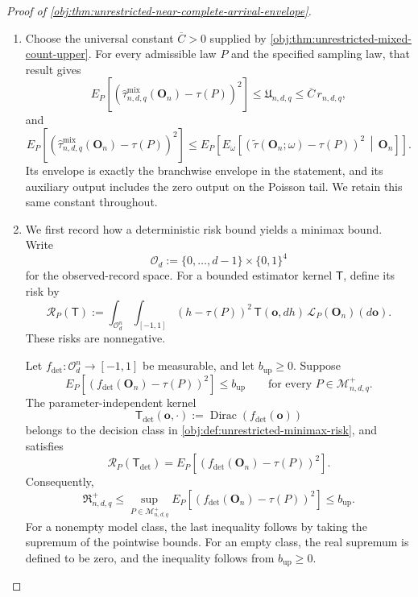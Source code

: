 \begin{proof}[Proof of \cref{obj:thm:unrestricted-near-complete-arrival-envelope}]
\begin{enumerate}
\item Choose the universal constant \(\overline C>0\) supplied by
\cref{obj:thm:unrestricted-mixed-count-upper}. For every admissible law \(P\) and the specified sampling law, that result gives
\[
E_P\!\left[
\left(\widehat\tau^{\mathrm{mix}}_{n,d,q}(\mathbf O_n)-\tau(P)\right)^2
\right]
\le \mathfrak U_{n,d,q}
\le \overline C\,r_{n,d,q},
\]
and
\[
E_P\!\left[
\left(\widehat\tau^{\mathrm{mix}}_{n,d,q}(\mathbf O_n)-\tau(P)\right)^2
\right]
\le
E_P\!\left[
E_\omega\!\left[
\left(\widetilde\tau(\mathbf O_n;\omega)-\tau(P)\right)^2
\,\middle|\,\mathbf O_n
\right]\right].
\]
Its envelope is exactly the branchwise envelope in the statement, and its auxiliary output includes the zero output on the Poisson tail. We retain this same constant throughout.

\item We first record how a deterministic risk bound yields a minimax bound. Write
\[
\mathcal O_d:=\{0,\ldots,d-1\}\times\{0,1\}^{4}
\]
for the observed-record space. For a bounded estimator kernel \(\mathsf T\), define its risk by
\[
\mathcal R_P(\mathsf T)
:=
\int_{\mathcal O_d^n}\int_{[-1,1]}
(h-\tau(P))^2\,\mathsf T(\mathbf o,dh)\,
\mathcal L_P(\mathbf O_n)(d\mathbf o).
\]
These risks are nonnegative.

Let \(f_{\mathrm{det}}:\mathcal O_d^n\to[-1,1]\) be measurable, and let \(b_{\mathrm{up}}\ge0\). Suppose
\[
E_P\!\left[
\left(f_{\mathrm{det}}(\mathbf O_n)-\tau(P)\right)^2
\right]\le b_{\mathrm{up}}
\qquad
\text{for every }P\in\mathcal M^{+}_{n,d,q}.
\]
The parameter-independent kernel
\[
\mathsf T_{\mathrm{det}}(\mathbf o,\cdot)
:=\operatorname{Dirac}\!\left(f_{\mathrm{det}}(\mathbf o)\right)
\]
belongs to the decision class in \cref{obj:def:unrestricted-minimax-risk}, and satisfies
\[
\mathcal R_P(\mathsf T_{\mathrm{det}})
=
E_P\!\left[
\left(f_{\mathrm{det}}(\mathbf O_n)-\tau(P)\right)^2
\right].
\]
Consequently,
\[
\mathfrak R^{+}_{n,d,q}
\le
\sup_{P\in\mathcal M^{+}_{n,d,q}}
E_P\!\left[
\left(f_{\mathrm{det}}(\mathbf O_n)-\tau(P)\right)^2
\right]
\le b_{\mathrm{up}}.
\]
For a nonempty model class, the last inequality follows by taking the supremum of the pointwise bounds. For an empty class, the real supremum is defined to be zero, and the inequality follows from \(b_{\mathrm{up}}\ge0\).


\end{enumerate}
\end{proof}
